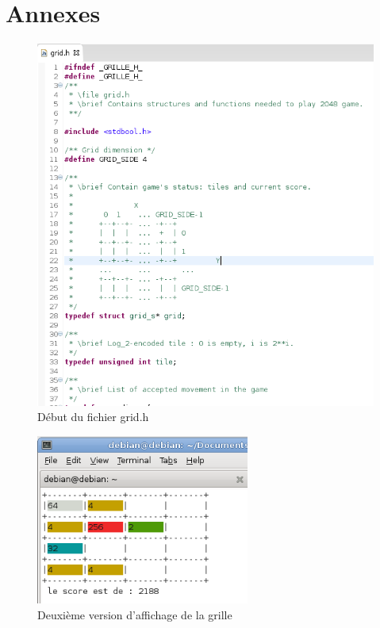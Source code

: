 \documentclass[12pt]{article}
\begin{document}
\newpage
\section{Annexes}
\listoffigures
\begin{figure}
   \caption{\label{grid_h} Début du fichier grid.h}
   \includegraphics[scale=0.6]{grid_h.png}
\end{figure}

\begin{figure}
   \caption{\label{grille_couleur} Deuxième version d'affichage de la grille}
   \includegraphics[width=7cm]{grille_couleur.png}
\end{figure}
\end{document}
